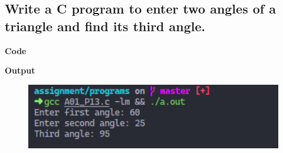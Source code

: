 \documentclass[a4paper]{article}
\begin{document}
\newpage



\subsection{Write a C program to enter two angles of a triangle and find its third angle.}
\textbf{Code}



\textbf{Output}

\begin{figure}[h]
  \includegraphics[width=12cm]{A01_P13}
\end{figure}

\newpage

\end{document}
